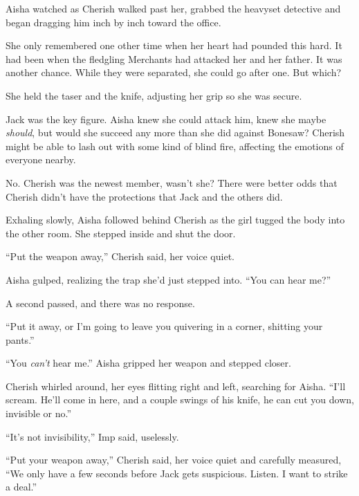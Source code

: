 Aisha watched as Cherish walked past her, grabbed the heavyset detective and began dragging him inch by inch toward the office.



She only remembered one other time when her heart had pounded this hard.  It had been when the fledgling Merchants had attacked her and her father.  It was another chance.  While they were separated, she could go after one.  But which?



She held the taser and the knife, adjusting her grip so she was secure.



Jack was the key figure.  Aisha knew she could attack him, knew she maybe \emph{should}, but would she succeed any more than she did against Bonesaw?  Cherish might be able to lash out with some kind of blind fire, affecting the emotions of everyone nearby.



No.  Cherish was the newest member, wasn't she?  There were better odds that Cherish didn't have the protections that Jack and the others did.



Exhaling slowly, Aisha followed behind Cherish as the girl tugged the body into the other room.  She stepped inside and shut the door.



``Put the weapon away,'' Cherish said, her voice quiet.



Aisha gulped, realizing the trap she'd just stepped into.  ``You can hear me?''



A second passed, and there was no response.



``Put it away, or I'm going to leave you quivering in a corner, shitting your pants.''



``You \emph{can't} hear me.''  Aisha gripped her weapon and stepped closer.



Cherish whirled around, her eyes flitting right and left, searching for Aisha.  ``I'll scream.  He'll come in here, and a couple swings of his knife, he can cut you down, invisible or no.''



``It's not invisibility,'' Imp said, uselessly.



``Put your weapon away,'' Cherish said, her voice quiet and carefully measured, ``We only have a few seconds before Jack gets suspicious.  Listen.  I want to strike a deal.''





